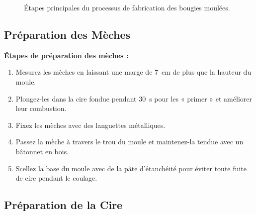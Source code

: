 \documentclass[11pt,fleqn,onecolumn,oneside]{book}
\begin{document}
\begin{figure}[H]
    \caption{Étapes principales du processus de fabrication des bougies moulées.}
    \label{fig:processus-bougies-moulees}
\end{figure}

\subsection*{Préparation des Mèches}

\begin{exercise}
\textbf{Étapes de préparation des mèches :}
\begin{enumerate}
    \item Mesurez les mèches en laissant une marge de \SI{7}{\centi\metre} de plus que la hauteur du moule.
    \item Plongez-les dans la cire fondue pendant \SI{30}{\second} pour les « primer » et améliorer leur combustion.
    \item Fixez les mèches avec des languettes métalliques.
    \item Passez la mèche à travers le trou du moule et maintenez-la tendue avec un bâtonnet en bois.
    \item Scellez la base du moule avec de la pâte d’étanchéité pour éviter toute fuite de cire pendant le coulage.
\end{enumerate}
\end{exercise}


\subsection*{Préparation de la Cire}
\end{document}
